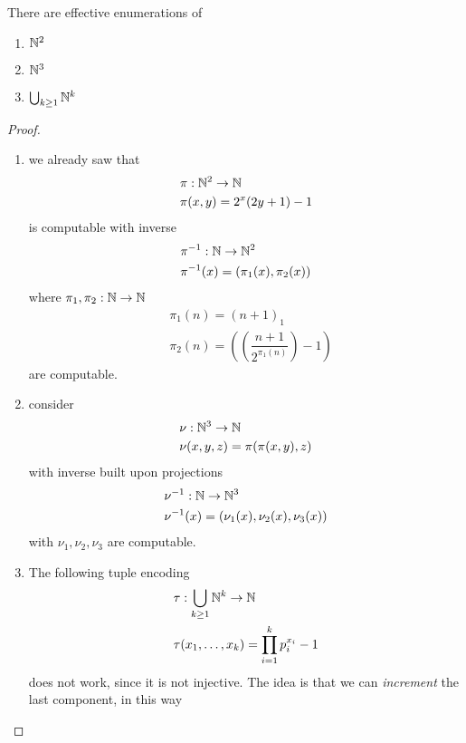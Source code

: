 \begin{lemma}
  There are effective enumerations of
  \begin{enumerate}[label=(\arabic*)]
  \item $ \mathbb{N}^2 $
  \item $ \mathbb{N}^3 $
  \item $\bigcup_{k\geq 1} \mathbb{N}^k $
  \end{enumerate}
  \begin{proof}
    \begin{enumerate}[label=(\arabic*)]
    \item we already saw that 
      \begin{align*}
        &\pi : \mathbb{N}^2 \to
        \mathbb{N} \\
        &\pi(x,y) = 2^x(2y+1)-1
      \end{align*}  
     is computable
       with inverse
       \begin{align*}
        &\pi^{-1} : \mathbb{N} \to \mathbb{N}^2\\
        &\pi^{-1}(x) = (\pi_1(x), \pi_2(x))
       \end{align*}
      where $\pi_1,\pi_2 : \mathbb{N} \to \mathbb{N}$
      \begin{align*}
        &\pi_1 (n) = (n+1)_1\\
        &\pi_2(n) = \left(\left(\dfrac{n+1}{2^{\pi_1(n)}}\right)-1\right)
       \end{align*}
       are computable.
    \item{
        consider 
        \begin{align*}
          &\nu : \mathbb{N}^3 \to
          \mathbb{N}\\
          &\nu(x,y,z)= \pi(\pi(x,y),z)
        \end{align*}
        with inverse built upon projections
        \begin{align*}
          &\nu^{-1} : \mathbb{N} \to \mathbb{N}^3\\
          &\nu^{-1}(x) = (\nu_1(x), \nu_2(x), \nu_3(x))
        \end{align*}
        with $\nu_1, \nu_2, \nu_3$ are computable.}
    \item{ The following tuple encoding
    \begin{align*}
      &\tau : \bigcup_{k \geq 1} \mathbb{N}^k \to \mathbb{N}\\
      &\tau(x_1, \dots, x_k) = \prod_{i=1}^{k}p_i^{x_i}-1
    \end{align*}
    does not work, since it is not injective.
    The idea is that we can \emph{increment} the last component, in this way
}
\end{enumerate}
\end{proof}
\end{lemma}
